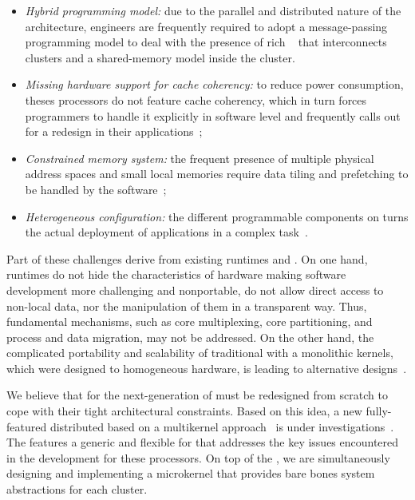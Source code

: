 	\begin{itemize}
		\item \textit{Hybrid programming model:} due to the parallel and
		distributed nature of the architecture, engineers are frequently
		required to adopt a message-passing programming model to deal
		with the presence of rich \nocs~\cite{kelly2013} that
		interconnects clusters and a shared-memory model inside the
		cluster.

		\item \textit{Missing hardware support for cache coherency:} to
		reduce power consumption, theses processors do not feature cache
		coherency, which in turn forces programmers to handle it
		explicitly in software level and frequently calls out for a
		redesign in their applications~\cite{francesquini2015};

		\item \textit{Constrained memory system:} the frequent presence
		of multiple physical address spaces and small local memories
		require data tiling and prefetching to be handled by the
		software~\cite{Castro2016};

		\item \textit{Heterogeneous configuration:} the different
		programmable components on \lightweight \manycores turns the
		actual deployment of applications in a complex
		task~\cite{barbalace2015}.
	\end{itemize}

	Part of these challenges derive from existing runtimes and \oss.
	On one hand, runtimes do not hide the characteristics of hardware
	making software development more challenging and nonportable, \eg do
	not allow direct access to non-local data, nor the manipulation of
	them in a transparent way. Thus, fundamental \os mechanisms, such
	as core multiplexing, core partitioning, and process and data
	migration, may not be addressed. On the other hand, the complicated
	portability and scalability of traditional \oss with a monolithic
	kernels, which were designed to homogeneous hardware, is leading to
	alternative \os designs~\cite{Baumann2009, kluge2014, nightingale2009, rhoden2011}.

	We believe that \oss for the next-generation of \lightweight
	\manycores must be redesigned from scratch to cope with their tight
	architectural constraints. Based on this idea, a new fully-featured
	distributed \os based on a multikernel approach~\cite{Baumann2009}
	is under investigations~\cite{penna2017-1,penna2017-2,penna2019}.
	The \nanvix \multikernel features a generic and flexible \hal for
	\lightweight \manycores that addresses the key issues encountered in
	the development for these processors. On top of the \nanvix
	\textit{\hal}, we are simultaneously designing and implementing a
	microkernel that provides bare bones system abstractions for each
	cluster.

